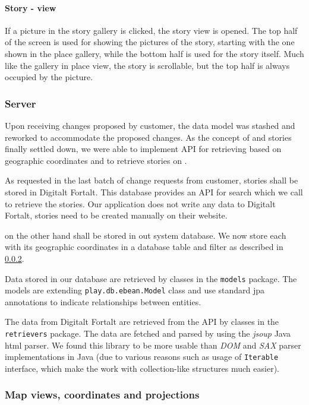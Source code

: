 \documentclass[11pt]{book}
\begin{document}
\paragraph{Story - view}
If a picture in the story gallery is clicked, the story view is opened. The top half of the screen is used for showing the pictures of the story, starting with the one shown in the place gallery, while the bottom half is used for the story itself. Much like the gallery in place view, the story is scrollable, but the top half is always occupied by the picture.

\subsubsection{Server}

Upon receiving changes proposed by customer, the data model was stashed and reworked to accommodate the proposed changes. As the concept of \wallentityp and stories finally settled down, we were able to implement API for retrieving \wallentityp based on geographic coordinates and to retrieve stories on \wallentityp.

As requested in the last batch of change requests from customer, stories shall be stored in Digitalt Fortalt. This database provides an API for search which we call to retrieve the stories. Our application does not write any data to Digitalt Fortalt, stories need to be created manually on their website.

\wallentitypcap on the other hand shall be stored in out system database. We now store each \wallentitys with its geographic coordinates in a database table and filter as described in \ref{sec:spr3_maps}. 

Data stored in our database are retrieved by classes in the \texttt{models} package. The models are extending \texttt{play.db.ebean.Model} class and use standard \gls{jpa} annotations to indicate relationships between entities.

The data from Digitalt Fortalt are retrieved from the API by classes in the \texttt{retrievers} package. The data are fetched and parsed by using the \emph{jsoup} Java \gls{html} parser. We found this library to be more usable than \emph{DOM} and \emph{SAX} parser implementations in Java (due to various reasons such as usage of \texttt{Iterable} interface, which make the work with collection-like structures much easier).

\subsubsection{Map views, coordinates and projections} \label{sec:spr3_maps}
\end{document}
